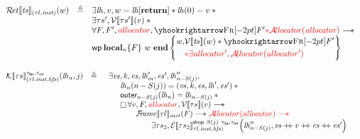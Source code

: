 \documentclass{standalone}
\begin{document}
\flushleft

\[
\begin{array}{rcl}
%
  \Rvalid \llbracket \V{ts} \rrbracket_{(\tau l, \V{inst})}(w) & \triangleq & \exists \V{lh}, v,  w = \V{lh}[\textbf{return}] \ast \V{lh}(0) = v \ast {}
\\
  & & \exists \tau s', \Vvalid\llbracket \tau s' \rrbracket(v) \ast {}
\\
  & & \forall F, F', \rr{allocator}, \frameR{} F' \rr{\ast{} \Avalid(\V{allocator})} \wand
\\
  & & \wprefr{w}{n}{F}{\begin{aligned} \V{w}, &\Vvalid \llbracket \V{ts} \rrbracket(w) \ast{} \frameR{} F' \\ & \rr{\ast{} \exists\V{allocator'}, \Avalid(\V{allocator'})} \end{aligned} }
%
\end{array}
\]



\[
\begin{array}{rcl}
  \CONTvalid \llbracket \tau s \rrbracket_{(\tau l, \V{inst}, \V{hfs})}^{\tau_{\K{lbs}}, \tau_{\K{ret}}}(\V{lh}_n,j) & \triangleq &
  \begin{array}[t]{l}
    \exists \V{vs}, k, \V{es}, \V{lh}'_m, \V{es'}, \V{lh}''_{n - S(j)},
  \\
    \quad
    \begin{array}{l}
      \V{lh}_n(n - S(j)) = (\V{vs},k,\V{es},\V{lh}',\V{es}') \ast {}
    \\
      \K{outer}_{n - S(j)}(\V{lh}_n) = \V{lh}_{n - S(j)} \ast {}
    \\
    \always \forall v, F, \rr{\V{allocator}}, \Vvalid \llbracket \tau s \rrbracket(v) \wand
                                                                                                          \\
                                                                                                          \qquad{} \FRvalid \llbracket \tau l \rrbracket_{\V{inst}}(F) \wand \rr{\Avalid(\V{allocator}) \wand}
                                                                                                          \\
                                                                                                          \qquad\qquad{} \exists \tau s_2, \Evalid \llbracket \tau s_2 \rrbracket_{\tau l, \V{inst}, \V{hfs})}^{\K{drop}~S(j)~\tau_{\K{lbs}},\tau_{\K{ret}}}{ \left(\V{lh}''_{n - S(j)}, \V{vs}\mdoubleplus v \mdoubleplus \V{es} \mdoubleplus \V{es}' \right) }\\[1em]
      \end{array}
    \end{array}
  \end{array}
\]
\end{document}
